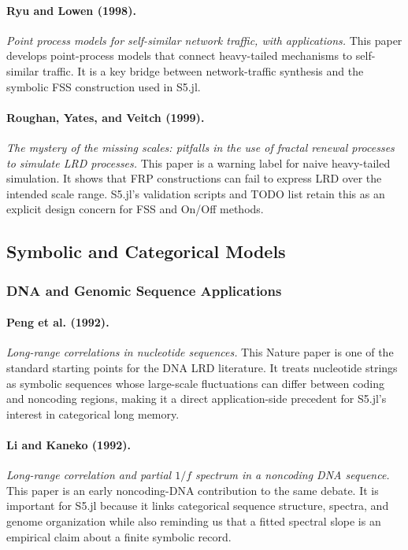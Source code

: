 \documentclass[11pt]{article}
\begin{document}
\paragraph{Ryu and Lowen (1998).}
\emph{Point process models for self-similar network traffic, with applications.}
This paper develops point-process models that connect heavy-tailed mechanisms to
self-similar traffic. It is a key bridge between network-traffic synthesis and
the symbolic FSS construction used in S5.jl.

\paragraph{Roughan, Yates, and Veitch (1999).}
\emph{The mystery of the missing scales: pitfalls in the use of fractal renewal
processes to simulate LRD processes.}
This paper is a warning label for naive heavy-tailed simulation. It shows that
FRP constructions can fail to express LRD over the intended scale range. S5.jl's
validation scripts and TODO list retain this as an explicit design concern for
FSS and On/Off methods.

\subsection{Symbolic and Categorical Models}

\subsubsection{DNA and Genomic Sequence Applications}

\paragraph{Peng et al. (1992).}
\emph{Long-range correlations in nucleotide sequences.}
This Nature paper is one of the standard starting points for the DNA LRD
literature. It treats nucleotide strings as symbolic sequences whose large-scale
fluctuations can differ between coding and noncoding regions, making it a direct
application-side precedent for S5.jl's interest in categorical long memory.

\paragraph{Li and Kaneko (1992).}
\emph{Long-range correlation and partial $1/f$ spectrum in a noncoding DNA
sequence.}
This paper is an early noncoding-DNA contribution to the same debate. It is
important for S5.jl because it links categorical sequence structure, spectra,
and genome organization while also reminding us that a fitted spectral slope is
an empirical claim about a finite symbolic record.
\end{document}
